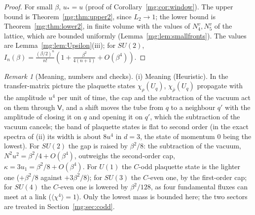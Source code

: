 \documentclass[11pt,a4paper]{article}
\theoremstyle{definition}
\theoremstyle{remark}
\newtheorem{remark}[theorem]{Remark}
\begin{document}
\begin{proof}
For small $\beta$, $u_*=u$ (proof of Corollary~\ref{mg:cor:window}). The upper bound is Theorem~\ref{mg:thm:upper2}, since $L_2\to1$; the lower bound is
Theorem~\ref{mg:thm:lower2}, in finite volume with the values of $N^v_4,N^v_5$ of the lattice, which are bounded uniformly
(Lemma~\ref{mg:lem:smallfronts}). The values are Lemma~\ref{mg:lem:Upsilon}(iii); for $SU(2)$, $I_n(\beta)=\frac{(\beta/2)^n}{n!}(1+\frac{\beta^2}{4(n+1)}+O(\beta^4))$.
\end{proof}

\begin{remark}[Meaning, numbers and checks]\label{mg:rem:second}
(i) Meaning (Heuristic). In the transfer-matrix picture the plaquette states $\chi_\rho(U_q)$, $\chi_{\bar\rho}(U_q)$ propagate with the amplitude $u^4$ per
unit of time, the cap and the subtraction of the vacuum act on them through $\mathsf V$, and a shift moves the tube from $q$ to a neighbour $q'$ with the
amplitude of closing it on $q$ and opening it on $q'$, which the subtraction of the vacuum cancels; the band of plaquette states is flat to second
order (in the exact spectra of (ii) its width is about $8u^4$ in $d=3$, the state of momentum $0$ being the lowest). For $SU(2)$ the gap is raised by $\beta^2/8$: the subtraction of the vacuum, $N^2u^2=\beta^2/4+O(\beta^4)$, outweighs the second-order cap,
$\kappa=3u_1=\beta^2/8+O(\beta^4)$. For $U(1)$ the $C$-odd plaquette state is the lighter one ($+\beta^2/8$ against $+3\beta^2/8$); for $SU(3)$ the $C$-even one, by the
first-order cap; for $SU(4)$ the $C$-even one is lowered by $\beta^2/128$, as four fundamental fluxes can meet at a link ($\langle\chi^4\rangle=1$).
Only the lowest mass is bounded here; the two sectors are treated in Section~\ref{mg:sec:codd}.


\end{remark}
\end{document}
